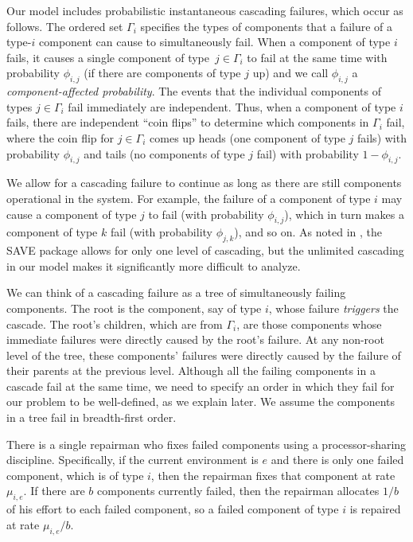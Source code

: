 \documentclass[12pt]{article}
\begin{document}
Our model includes probabilistic instantaneous cascading failures, which occur as follows. The ordered set $\Gamma_i$ specifies the types of components that a failure of a type-$i$ component can cause to simultaneously fail. When a component of type $i$ fails, it causes a single  component of type~$j \in \Gamma_i$ to fail at the same time with probability $\phi_{i, j}$ (if there are components of type $j$ up) and we call $\phi_{i, j}$  a \textit{component-affected probability}. The events that the individual components of types $j \in \Gamma_i$ fail immediately are independent. Thus, when a component of type $i$ fails, there are independent ``coin flips'' to determine which components in $\Gamma_i$ fail, where the coin flip for $j \in \Gamma_i$ comes up heads (one component of type $j$ fails) with probability $\phi_{i, j}$ and tails (no components of type $j$ fail) with probability $1 - \phi_{i, j}$.

We allow for a cascading failure to continue as long as there are still components operational in the system.  For example, the failure of a component of type $i$ may cause a component of type $j$ to fail (with probability $\phi_{i, j}$), which in turn makes a component of type $k$ fail (with probability $\phi_{j, k}$), and so on. As noted in \cite{ING:2009}, the SAVE package \cite{BHLNS:1994} allows for only one level of cascading, but the unlimited cascading in our model makes it significantly more difficult to analyze.

We can think of a cascading failure as a tree of simultaneously failing components. The root is the component, say of type $i$, whose failure \textit{triggers} the cascade. The root's children, which are from $\Gamma_i$, are those components whose immediate failures were directly caused by the root's failure. At any non-root level of the tree,  these components' failures were directly caused by the failure of their parents at the previous level. Although all the failing components in a cascade fail at the same time, we need to specify an order in which they fail for our problem to be well-defined, as we explain later. We assume the components in a tree fail in breadth-first order.

There is a single repairman who fixes failed components using a processor-sharing discipline. Specifically, if the current environment is $e$ and there is only one failed component, which is of type $i$, then the repairman fixes that component at rate $\mu_{i, e}$. If there are $b$ components currently failed, then the repairman allocates $1 / b$ of his effort to each failed component, so a failed component of type $i$ is repaired at rate $\mu_{i, e}/b$.
\end{document}
